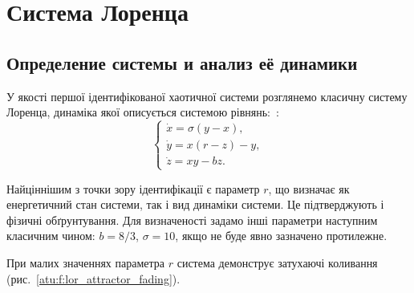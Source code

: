 
\FloatBarrier

\section{Система Лоренца} %
\label{atu:sect:lor}


\subsection{Определение системы и анализ её динамики} %

У якості першої ідентифікованої хаотичної системи розглянемо класичну систему
Лоренца, динаміка якої описується системою
рівнянь:~\cite{moon_chaotic_vibr,anisch_nonlin_eff,chulichkcov_mm_ml_dyn,berje_order_in_chaos}:
%
\begin{equation}
\begin{cases}
  \dot{x} = \sigma (y-x ) , \\
  \dot{y} = x (r-z) - y , \\
  \dot{z} = x y - b z .
\end{cases}
\label{atu:eq:lor}
\end{equation}

Найціннішим з точки зору ідентифікації є параметр $r$, що визначає як
енергетичний стан системи, так і вид динаміки системи. Це підтверджують і
фізичні обґрунтування. Для визначеності задамо інші параметри наступним
класичним чином: $b = 8/3$, $\sigma = 10$, якщо не буде явно
зазначено протилежне.


При малих значеннях параметра $r$ система демонструє затухаючі коливання
(рис.~\ref{atu:f:lor_attractor_fading}).


